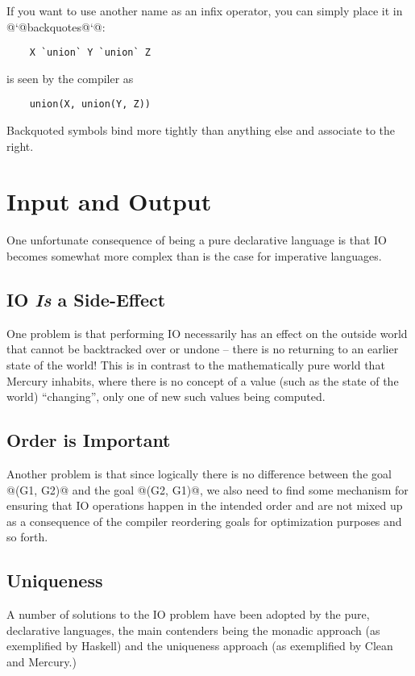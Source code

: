 \documentclass[a4paper,11pt,notitlepage,onecolumn]{article}
\begin{document}
If you want to use another name as an infix operator, you can
simply place it in @`@backquotes@`@:
\begin{verbatim}
    X `union` Y `union` Z
\end{verbatim}
is seen by the compiler as
\begin{verbatim}
    union(X, union(Y, Z))
\end{verbatim}
Backquoted symbols bind more tightly than anything else and
associate to the right.



\section{Input and Output}

One unfortunate consequence of being a pure declarative language
is that IO becomes somewhat more complex than is the case for
imperative languages.

\subsection{IO \emph{Is} a Side-Effect}

One problem is that performing IO necessarily has an effect on the
outside world that cannot be backtracked over or undone -- there is
no returning to an earlier state of the world!  This is in
contrast to the mathematically pure world that Mercury inhabits,
where there is no concept of a value (such as the state of the
world) ``changing'', only one of new such values being computed.

\subsection{Order is Important}

Another problem is that since logically there is no difference
between the goal @(G1, G2)@ and the goal @(G2, G1)@, we also need to
find some mechanism for ensuring that IO operations happen in the
intended order and are not mixed up as a consequence of the
compiler reordering goals for optimization purposes and so forth.

\subsection{Uniqueness}

A number of solutions to the IO problem have been adopted by
the pure, declarative languages, the main contenders being the
monadic approach (as exemplified by Haskell) and the
uniqueness approach (as exemplified by Clean and Mercury.)
\end{document}

